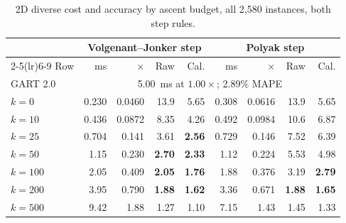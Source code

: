 \documentclass{article}
\begin{document}
\begin{table}[tbp]
\centering
\caption{2D diverse cost and accuracy by ascent budget, all 2{,}580 instances, both step rules.}
\label{tab:frontier_2d}
\setlength{\tabcolsep}{5pt}
\renewcommand{\arraystretch}{1.05}
\begin{tabular}{@{}lrrrrrrrr@{}}
\toprule
 & \multicolumn{4}{c}{Volgenant--Jonker step} & \multicolumn{4}{c}{Polyak step} \\
\cmidrule(lr){2-5}\cmidrule(lr){6-9}
Row & ms & $\times$ & Raw & Cal. & ms & $\times$ & Raw & Cal. \\
\midrule
GART 2.0 & \multicolumn{8}{c}{5.00~ms at $1.00\times$; 2.89\% MAPE} \\
$k=0$ & 0.230 & 0.0460 & 13.9 & 5.65 & 0.308 & 0.0616 & 13.9 & 5.65 \\
$k=10$ & 0.436 & 0.0872 & 8.35 & 4.26 & 0.492 & 0.0984 & 10.6 & 6.87 \\
$k=25$ & 0.704 & 0.141 & 3.61 & \textbf{2.56} & 0.729 & 0.146 & 7.52 & 6.39 \\
$k=50$ & 1.15 & 0.230 & \textbf{2.70} & \textbf{2.33} & 1.12 & 0.224 & 5.53 & 4.98 \\
$k=100$ & 2.05 & 0.409 & \textbf{2.05} & \textbf{1.76} & 1.88 & 0.376 & 3.19 & \textbf{2.79} \\
$k=200$ & 3.95 & 0.790 & \textbf{1.88} & \textbf{1.62} & 3.36 & 0.671 & \textbf{1.88} & \textbf{1.65} \\
$k=500$ & 9.42 & 1.88 & 1.27 & 1.10 & 7.15 & 1.43 & 1.45 & 1.33 \\
\bottomrule
\end{tabular}
\end{table}
\end{document}
